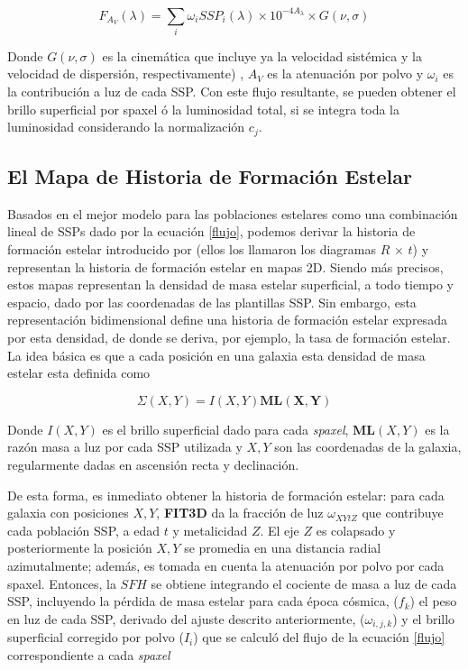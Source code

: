 \begin{equation}
 F_{A_V}(\lambda)  = \sum_{i} \omega_i  SSP_{i}(\lambda) \times 10^{-4 A_{\lambda}} \times G(\nu,\sigma)
 \label{flujo}
 \end{equation}

\noindent  Donde $G(\nu ,\sigma)$ es la cinemática que incluye ya la velocidad sistémica y la velocidad de dispersión, respectivamente)  , $A_V$ es la atenuación por polvo y $\omega_i$ es la contribución a luz de cada SSP. Con este flujo resultante, se pueden obtener el brillo superficial por spaxel ó la luminosidad total, si se integra toda la luminosidad considerando la normalización $c_j$.



\subsection{El Mapa de Historia de Formación Estelar}

Basados en el mejor modelo para las poblaciones estelares como una combinación lineal de SSPs dado por la ecuación \ref{flujo}, podemos derivar la historia de formación estelar  introducido por \citep{cid2013_1} (ellos los llamaron los diagramas $R$ $\times$ $t$) y representan la historia de formación estelar en mapas 2D. Siendo más precisos, estos mapas representan la densidad de masa estelar superficial, a todo tiempo y espacio, dado por las coordenadas de las plantillas SSP. Sin embargo, esta representación bidimensional define una historia de formación estelar expresada por esta densidad, de donde se deriva, por ejemplo, la tasa de formación estelar. La idea básica  es que a cada posición en una galaxia esta densidad de masa estelar esta definida como

\begin{equation}
\Sigma (X,Y) = I (X,Y) \mathbf{ML (X,Y)}
\end{equation}

\bigskip

\noindent Donde $I (X,Y)$ es el brillo superficial dado para cada \textsl{spaxel}, $\mathbf{ML}(X,Y)$ es la razón masa a luz por cada SSP utilizada  y $X,Y$ son las coordenadas de la galaxia, regularmente dadas en ascensión recta y declinación.



\bigskip

\noindent De esta forma, es inmediato obtener la historia de formación estelar: para cada galaxia con posiciones $X,Y$, \textbf{FIT3D} da la fracción de luz $\omega_{XYtZ}$ que contribuye cada población SSP, a edad $t$ y metalicidad $Z$. El eje $Z$ es colapsado y posteriormente la posición $X,Y$ se promedia  en una distancia radial azimutalmente; además, es tomada en cuenta la atenuación por polvo por cada spaxel. Entonces, la $SFH$ se obtiene integrando el cociente de masa a luz de cada SSP, incluyendo la pérdida de masa estelar para cada época cósmica, ($f_{k}$)  el peso en luz de cada SSP, derivado del ajuste descrito anteriormente, ($\omega_{i,j,k}$) y el brillo superficial corregido  por polvo ($I_{i}$)  que se calculó del flujo de la ecuación \ref{flujo} correspondiente a cada \textsl{spaxel}

